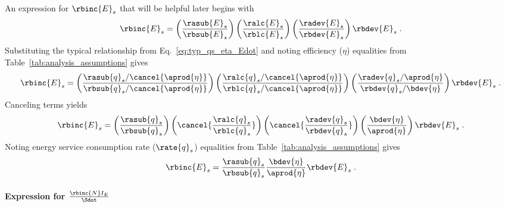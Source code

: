 An expression for $\rbinc{E}_s$ that will be helpful later
begins with
%
\begin{equation}
  \rbinc{E}_s = \left( \frac{\rasub{E}_s}{\rbsub{E}_s} \right)
                \left( \frac{\ralc{E}_s}{\rblc{E}_s} \right)
                \left( \frac{\radev{E}_s}{\rbdev{E}_s} \right)
                \rbdev{E}_s \; .
\end{equation}
%
Substituting the typical relationship from Eq.~\ref{eq:typ_qs_eta_Edot} and noting efficiency ($\eta$)
equalities from Table~\ref{tab:analysis_assumptions} gives
%
\begin{equation}
  \rbinc{E}_s = \left( \frac{\rasub{q}_s / \cancel{\aprod{\eta}}}{\rbsub{q}_s / \cancel{\aprod{\eta}}} \right)
                \left( \frac{\ralc{q}_s / \cancel{\aprod{\eta}}}{\rblc{q}_s / \cancel{\aprod{\eta}}} \right)
                \left( \frac{\radev{q}_s / \aprod{\eta}}{\rbdev{q}_s / \bdev{\eta}} \right)
                \rbdev{E}_s \; .
\end{equation}
%
Canceling terms yields
%
\begin{equation}
  \rbinc{E}_s = \left( \frac{\rasub{q}_s}{\rbsub{q}_s} \right)
                \left( \cancel{\frac{\ralc{q}_s}{\rblc{q}_s}} \right)
                \left( \cancel{\frac{\radev{q}_s}{\rbdev{q}_s}} \right)
                \left( \frac{\bdev{\eta}}{\aprod{\eta}}  \right)
                \rbdev{E}_s \; .
\end{equation}
%
Noting energy service consumption rate ($\rate{q}_s$) equalities from Table~\ref{tab:analysis_assumptions} gives
%
\begin{equation} \label{eq:E_dot_s_hat}
  \rbinc{E}_s = \frac{\rasub{q}_s}{\rbsub{q}_s}
                \frac{\bdev{\eta}}{\aprod{\eta}}
                \rbdev{E}_s \; .
\end{equation}

\paragraph{Expression for $\frac{\rbinc{N} I_E}{\Sdot}$}
\label{sec:N_dot_hat_I_E_over_Sdot}

